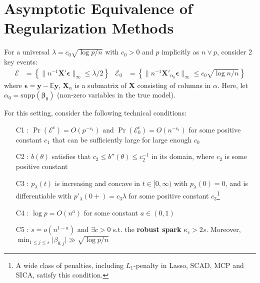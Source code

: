 \documentclass[twoside]{article}
\begin{document}
\section{Asymptotic Equivalence of Regularization Methods}
For a universal $\lambda=c_0\sqrt{\log p /n}$ with $c_0>0$ and $p$ implicitly as $n \vee p$, consider 2 key events:
\begin{align*}
    \mathcal{E}&=\left\{ \lVert n^{-1} \mathbf{X}'\boldsymbol{\epsilon} \rVert _{\infty} \leq \lambda/2 \right\} & \mathcal{E}_0 &= \left\{ \lVert n^{-1}\mathbf{X}'_{\alpha_0}\boldsymbol{\epsilon} \rVert _{\infty} \leq c_0 \sqrt{\log n/n}  \right\} 
\end{align*}
where $\boldsymbol{\epsilon}=\mathbf{y}-\mathbb{E}\mathbf{y}$, $\mathbf{X}_{\alpha}$ is a submatrix of $\mathbf{X}$ consisting of columns in $\alpha$. Here, let $\alpha_0= \mathrm{supp}\left(\boldsymbol{\beta}_0 \right)$ (non-zero variables in the true model).

For this setting, consider the following technical conditions:
\begin{itemize}
    \item[C1] : $\Pr (\mathcal{E}^c) = O(p^{-c_1})$ and $\Pr (\mathcal{E}^c_0) = O(n^{-c_1})$ for some positive constant $c_1$ that can be sufficiently large for large enough $c_0$
    \item[C2] : $b(\theta)$ satisfies that $c_2\leq b''(\theta)\leq c_2^{-1}$ in its domain, where $c_2$ is some positive constant
    \item[C3] : $p_{\lambda}(t)$ is increasing and concave in $t\in [0,\infty)$ with $p_{\lambda}(0)=0$, and is differentiable with $p'_{\lambda}(0+) = c_3\lambda$ for some positive constant $c_3$\footnote{A wide class of penalties, including $L_1$-penalty in Lasso, SCAD, MCP and SICA, satisfy this condition.}
    \item[C4] : $\log p=O(n^a)$ for some constant $a\in (0,1)$
    \item[C5] : $s=o(n^{1-a})$ and $\exists c>0$ s.t. the \textbf{robust spark} $\kappa_c > 2s$. Moreover, $\min_{1\leq j\leq s}\lvert \beta_{0,j}\rvert \gg \sqrt{\log p/n}$
\end{itemize}
\end{document}
